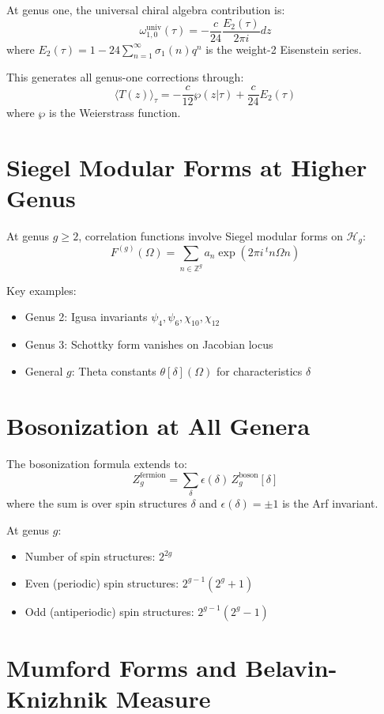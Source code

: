 At genus one, the universal chiral algebra contribution is:
$$\omega_{1,0}^{\text{univ}}(\tau) = -\frac{c}{24} \frac{E_2(\tau)}{2\pi i} dz$$
where $E_2(\tau) = 1 - 24\sum_{n=1}^{\infty} \sigma_1(n)q^n$ is the weight-2 Eisenstein series.

This generates all genus-one corrections through:
$$\langle T(z) \rangle_{\tau} = -\frac{c}{12} \wp(z|\tau) + \frac{c}{24} E_2(\tau)$$
where $\wp$ is the Weierstrass function.

\section{Siegel Modular Forms at Higher Genus}

At genus $g \geq 2$, correlation functions involve Siegel modular forms on $\mathcal{H}_g$:
$$F^{(g)}(\Omega) = \sum_{n \in \mathbb{Z}^g} a_n \exp(2\pi i \, {}^t n \Omega n)$$

Key examples:
\begin{itemize}
\item Genus 2: Igusa invariants $\psi_4, \psi_6, \chi_{10}, \chi_{12}$
\item Genus 3: Schottky form vanishes on Jacobian locus
\item General $g$: Theta constants $\theta[\delta](\Omega)$ for characteristics $\delta$
\end{itemize}

\section{Bosonization at All Genera}

The bosonization formula extends to:
$$Z_g^{\text{fermion}} = \sum_{\delta} \epsilon(\delta) \, Z_g^{\text{boson}}[\delta]$$
where the sum is over spin structures $\delta$ and $\epsilon(\delta) = \pm 1$ is the Arf invariant.

At genus $g$:
\begin{itemize}
\item Number of spin structures: $2^{2g}$
\item Even (periodic) spin structures: $2^{g-1}(2^g + 1)$
\item Odd (antiperiodic) spin structures: $2^{g-1}(2^g - 1)$
\end{itemize}

\section{Mumford Forms and Belavin-Knizhnik Measure}

